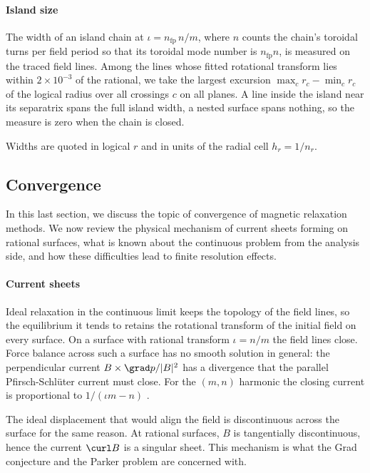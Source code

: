 \documentclass[%
 reprint,
 superscriptaddress,
 amsmath,amssymb,
 aps, nofootinbib, floatfix]{revtex4-2}
\begin{document}
\paragraph{Island size}
The width of an island chain at $\iota = n_{\mathrm{fp}} \, n / m$, where $n$ counts the chain's toroidal turns per field period so that its toroidal mode number is $n_{\mathrm{fp}} n$, is measured on the traced field lines. Among the lines whose fitted rotational transform lies within $2\times 10^{-3}$ of the rational, we take the largest excursion $\max_c r_c - \min_c r_c$ of the logical radius over all crossings $c$ on all planes. A line inside the island near its separatrix spans the full island width, a nested surface spans nothing, so the measure is zero when the chain is closed. 

Widths are quoted in logical $r$ and in units of the radial cell $h_r = 1/n_r$.

\subsection{Convergence}
\label{subsec:convergence}

In this last section, we discuss the topic of convergence of magnetic relaxation methods. We now review the physical mechanism of current sheets forming on rational surfaces, what is known about the continuous problem from the analysis side, and how these difficulties lead to finite resolution effects. 

\paragraph{Current sheets}
Ideal relaxation in the continuous limit keeps the topology of the field lines, so the equilibrium it tends to retains the rotational transform of the initial field on every surface. On a surface with rational transform $\iota = n/m$ the field lines close. Force balance across such a surface has no smooth solution in general: the perpendicular current $B \times \grad p / |B|^2$ has a divergence that the parallel Pfirsch-Schlüter current must close. For the $(m, n)$ harmonic the closing current is proportional to $1 / (\iota m - n)$ \citep{loizu_magnetic_2015}.

The ideal displacement that would align the field is discontinuous across the surface for the same reason. At rational surfaces, $B$ is tangentially discontinuous, hence the current $\curl B$ is a singular sheet. This mechanism is what the Grad conjecture \citep{grad_toroidal_1967, constantin_flexibility_2021} and the Parker problem \citep{parker_spontaneous_1994, moffatt_magnetostatic_1985} are concerned with.
\end{document}
